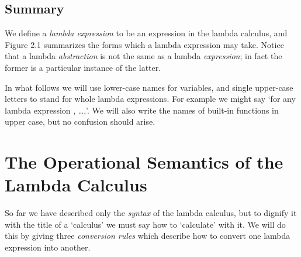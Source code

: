 \subsection{Summary}
We define a \textit{lambda expression} to be an expression in the lambda calculus, and
Figure 2.1 summarizes the forms which a lambda expression may take. Notice
that a lambda \textit{abstraction} is not the same as a lambda \textit{expression}; in fact the
former is a particular instance of the latter.


In what follows we will use lower-case names for variables, and single
upper-case letters to stand for whole lambda expressions. For example we
might say `for any lambda expression , \dots,'. We will also write the names of
built-in functions in upper case, but no confusion should arise.

\section{The Operational Semantics of the Lambda Calculus}

So far we have described only the \textit{syntax} of the lambda calculus, but to dignify
it with the title of a `calculus' we must say how to `calculate' with it. We will do
this by giving three \textit{conversion rules} which describe how to convert one
lambda expression into another.

